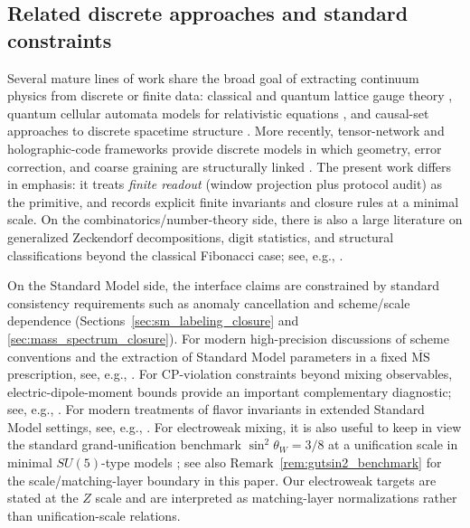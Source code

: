 \subsection{Related discrete approaches and standard constraints}
Several mature lines of work share the broad goal of extracting continuum physics from discrete or finite data:
classical and quantum lattice gauge theory \cite{Wilson1974,KogutSusskind1975HamiltonianLGT,Rothe2012},
quantum cellular automata models for relativistic equations \cite{BialynickiBirula1994QCA},
and causal-set approaches to discrete spacetime structure \cite{Bombelli1987CausalSet}.
More recently, tensor-network and holographic-code frameworks provide discrete models in which geometry, error correction, and coarse graining are structurally linked \cite{Vidal2007MERA,Swingle2012EntanglementHolography,Pastawski2015HolographicCodes}.
The present work differs in emphasis: it treats \emph{finite readout} (window projection plus protocol audit) as the primitive, and records explicit finite invariants and closure rules at a minimal scale.
On the combinatorics/number-theory side, there is also a large literature on generalized Zeckendorf decompositions, digit statistics, and structural classifications beyond the classical Fibonacci case; see, e.g., \cite{DemontignyEtAl2013FDecompositions,BenAriMiller2014ProbabilisticZeckendorf,Dekking2020StructureZeckendorf}.

On the Standard Model side, the interface claims are constrained by standard consistency requirements such as anomaly cancellation and scheme/scale dependence (Sections~\ref{sec:sm_labeling_closure} and \ref{sec:mass_spectrum_closure}).
For modern high-precision discussions of scheme conventions and the extraction of Standard Model parameters in a fixed $\overline{\mathrm{MS}}$ prescription, see, e.g., \cite{MartinRobertson2019TadpoleFreeMSbar}.
For CP-violation constraints beyond mixing observables, electric-dipole-moment bounds provide an important complementary diagnostic; see, e.g., \cite{Fukuyama2013EDM}.
For modern treatments of flavor invariants in extended Standard Model settings, see, e.g., \cite{deLimaNishi2024FlavorInvariantsVLQ}.
For electroweak mixing, it is also useful to keep in view the standard grand-unification benchmark $\sin^2\theta_W=3/8$ at a unification scale in minimal $SU(5)$-type models \cite{GeorgiGlashow1974SU5,Langacker1981GUT}; see also Remark~\ref{rem:gutsin2_benchmark} for the scale/matching-layer boundary in this paper.
Our electroweak targets are stated at the $Z$ scale and are interpreted as matching-layer normalizations rather than unification-scale relations.

